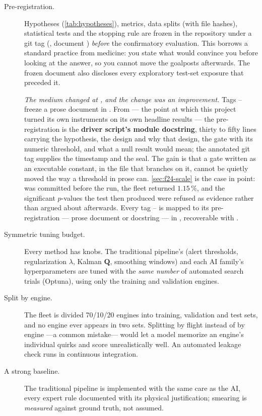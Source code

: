 \begin{description}
  \item[Pre-registration.] Hypotheses (\cref{tab:hypotheses}), metrics, data splits (with file
    hashes), statistical tests and the stopping rule are frozen in the repository under a git
    tag (, document ) \emph{before} the confirmatory
    evaluation. This borrows a standard practice from medicine: you state what would convince
    you before looking at the answer, so you cannot move the goalposts afterwards. The frozen
    document also discloses every exploratory test-set exposure that preceded it.

    \emph{The medium changed at , and the change was an improvement.} Tags
    -- freeze a prose document in . From  --- the
    point at which this project turned its own instruments on its own headline results ---
    the pre-registration is the \textbf{driver script's module docstring}, thirty to fifty
    lines carrying the hypothesis, the design and why that design, the gate with its numeric
    threshold, and what a null result would mean; the annotated git tag supplies the
    timestamp and the seal. The gain is that a gate written as an executable constant, in the
    file that branches on it, cannot be quietly moved the way a threshold in prose can.
    \cref{sec:f24-scale} is the case in point:  was committed before the
    run, the fleet returned $1.15\,\%$, and the significant $p$-values the test then produced
    were refused as evidence rather than argued about afterwards. Every tag
    -- is mapped to its pre-registration --- prose document
    or docstring --- in , recoverable with
    .
  \item[Symmetric tuning budget.] Every method has knobs. The traditional pipeline's
    (alert thresholds, regularization $\lambda$, Kalman $\mathbf{Q}$, smoothing windows) and
    each AI family's hyperparameters are tuned with the \emph{same number} of automated search
    trials (Optuna), using only the training and validation engines.
  \item[Split by engine.] The fleet is divided 70/10/20 engines into training, validation and
    test sets, and no engine ever appears in two sets. Splitting by flight instead of by engine
    ---a common mistake--- would let a model memorize an engine's individual quirks and score
    unrealistically well. An automated leakage check runs in continuous integration.
  \item[A strong baseline.] The traditional pipeline is implemented with the same care as the
    AI, every expert rule documented with its physical justification; smearing is
    \emph{measured} against ground truth, not assumed.
\end{description}

